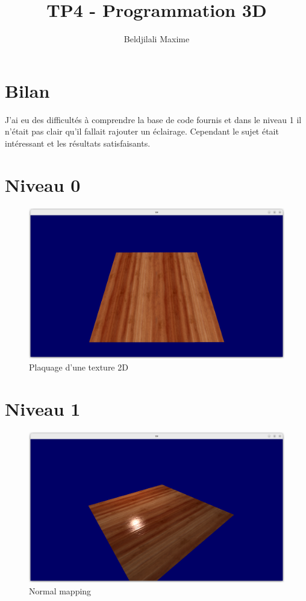 \documentclass{article}
\title{TP4 - Programmation 3D}
\author{Beldjilali Maxime}
\begin{document}
\maketitle

\section{Bilan}

J'ai eu des difficultés à comprendre la base de code fournis et dans le niveau 1 il n'était pas clair qu'il fallait rajouter un éclairage. Cependant le sujet était intéressant et les résultats satisfaisants.

\section{Niveau 0}

\begin{figure}[h]
    \centering
    \includegraphics[width=0.5\linewidth]{images/placageTexture.png}
    \caption{Plaquage d'une texture 2D}
    \label{fig:plaquageTexture}
\end{figure}

\section{Niveau 1}

\begin{figure}[h]
    \centering
    \includegraphics[width=0.5\linewidth]{images/normalMapping.png}
    \caption{Normal mapping}
    \label{fig:normalMapping}
\end{figure}

\newpage
\end{document}
